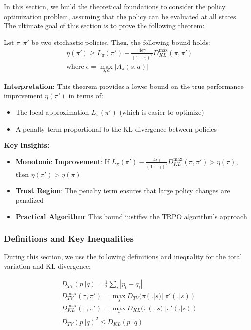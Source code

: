 In this section, we build the theoretical foundations to consider the policy optimization problem, assuming that the policy can be evaluated at all states. The ultimate goal of this section is to prove the following theorem:

\begin{theorem}\label{thm:policy-bound}
    Let $\pi, \pi'$ be two stochastic policies. Then, the following bound holds:
    \begin{align*}
    &\eta(\pi') \ge L_{\pi}(\pi') - \frac{4\epsilon\gamma}{(1-\gamma)^2}D_{KL}^{\max}(\pi, \pi') \\
    &\text{where } \epsilon = \max_{s, a} |A_{\pi}(s, a)|
    \end{align*}
\end{theorem}

\textbf{Interpretation:}
This theorem provides a lower bound on the true performance improvement $\eta(\pi')$ in terms of:
\begin{itemize}
    \item The local approximation $L_{\pi}(\pi')$ (which is easier to optimize)
    \item A penalty term proportional to the KL divergence between policies
\end{itemize}

\textbf{Key Insights:}
\begin{itemize}
    \item \textbf{Monotonic Improvement}: If $L_{\pi}(\pi') - \frac{4\epsilon\gamma}{(1-\gamma)^2}D_{KL}^{\max}(\pi, \pi') > \eta(\pi)$, then $\eta(\pi') > \eta(\pi)$
    \item \textbf{Trust Region}: The penalty term ensures that large policy changes are penalized
    \item \textbf{Practical Algorithm}: This bound justifies the TRPO algorithm's approach
\end{itemize}

\subsubsection{Definitions and Key Inequalities}

During this section, we use the following definitions and inequality for the total variation and KL divergence:

\begin{align*}
    &D_{TV}(p||q) = \frac{1}{2}\sum_{i}|p_i - q_i| \\
    &D_{TV}^{\max}(\pi, \pi') = \max_{s} D_{TV}(\pi(.|s)||\pi'(.|s))\\
    &D_{KL}^{\max}(\pi, \pi') = \max_{s} D_{KL}(\pi(.|s)||\pi'(.|s))\\
    &D_{TV}(p||q)^2 \le D_{KL}(p||q)
\end{align*}

